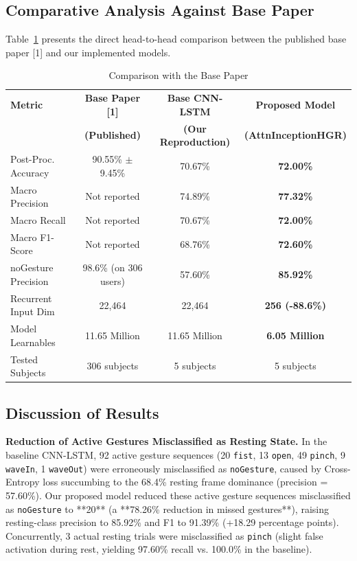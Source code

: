 \documentclass[conference]{IEEEtran}
\begin{document}
\subsection{Comparative Analysis Against Base Paper}
Table~\ref{tab:comparison_base} presents the direct head-to-head comparison between the published base paper [1] and our implemented models.

\begin{table}[h]
\centering
\caption{Comparison with the Base Paper}
\label{tab:comparison_base}
\begin{tabular}{lccc}
\toprule
\textbf{Metric} & \textbf{Base Paper [1]} & \textbf{Base CNN-LSTM} & \textbf{Proposed Model} \\
& \textbf{(Published)} & \textbf{(Our Reproduction)} & \textbf{(AttnInceptionHGR)} \\
\midrule
Post-Proc. Accuracy & 90.55\% $\pm$ 9.45\% & 70.67\% & \textbf{72.00\%} \\
Macro Precision & Not reported & 74.89\% & \textbf{77.32\%} \\
Macro Recall & Not reported & 70.67\% & \textbf{72.00\%} \\
Macro F1-Score & Not reported & 68.76\% & \textbf{72.60\%} \\
noGesture Precision & 98.6\% (on 306 users) & 57.60\% & \textbf{85.92\%} \\
Recurrent Input Dim & 22,464 & 22,464 & \textbf{256 (-88.6\%)} \\
Model Learnables & 11.65 Million & 11.65 Million & \textbf{6.05 Million} \\
Tested Subjects & 306 subjects & 5 subjects & 5 subjects \\
\bottomrule
\end{tabular}
\end{table}

\subsection{Discussion of Results}

\textbf{Reduction of Active Gestures Misclassified as Resting State.} In the baseline CNN-LSTM, 92 active gesture sequences (20 \texttt{fist}, 13 \texttt{open}, 49 \texttt{pinch}, 9 \texttt{waveIn}, 1 \texttt{waveOut}) were erroneously misclassified as \texttt{noGesture}, caused by Cross-Entropy loss succumbing to the 68.4\% resting frame dominance (precision = 57.60\%). Our proposed model reduced these active gesture sequences misclassified as \texttt{noGesture} to **20** (a **78.26\% reduction in missed gestures**), raising resting-class precision to 85.92\% and F1 to 91.39\% (+18.29 percentage points). Concurrently, 3 actual resting trials were misclassified as \texttt{pinch} (slight false activation during rest, yielding 97.60\% recall vs. 100.0\% in the baseline).
\end{document}

